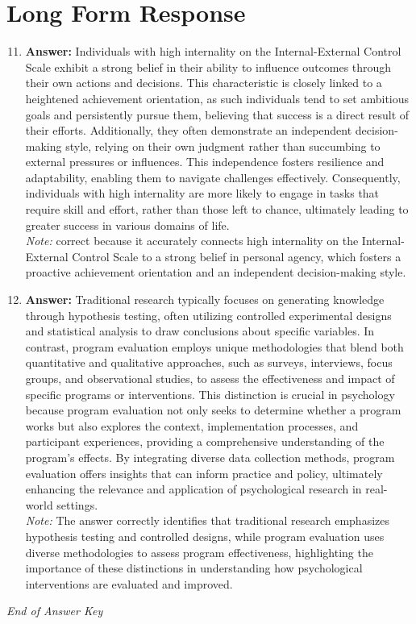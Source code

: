 \documentclass[12pt]{article}
\begin{document}
\section*{Long Form Response}
\begin{enumerate}[label=\arabic*.]
\setcounter{enumi}{10}
\item \textbf{Answer:} Individuals with high internality on the Internal-External Control Scale exhibit a strong belief in their ability to influence outcomes through their own actions and decisions. This characteristic is closely linked to a heightened achievement orientation, as such individuals tend to set ambitious goals and persistently pursue them, believing that success is a direct result of their efforts. Additionally, they often demonstrate an independent decision-making style, relying on their own judgment rather than succumbing to external pressures or influences. This independence fosters resilience and adaptability, enabling them to navigate challenges effectively. Consequently, individuals with high internality are more likely to engage in tasks that require skill and effort, rather than those left to chance, ultimately leading to greater success in various domains of life.
\\ \textit{Note:} correct because it accurately connects high internality on the Internal-External Control Scale to a strong belief in personal agency, which fosters a proactive achievement orientation and an independent decision-making style.
\item \textbf{Answer:} Traditional research typically focuses on generating knowledge through hypothesis testing, often utilizing controlled experimental designs and statistical analysis to draw conclusions about specific variables. In contrast, program evaluation employs unique methodologies that blend both quantitative and qualitative approaches, such as surveys, interviews, focus groups, and observational studies, to assess the effectiveness and impact of specific programs or interventions. This distinction is crucial in psychology because program evaluation not only seeks to determine whether a program works but also explores the context, implementation processes, and participant experiences, providing a comprehensive understanding of the program's effects. By integrating diverse data collection methods, program evaluation offers insights that can inform practice and policy, ultimately enhancing the relevance and application of psychological research in real-world settings.
\\ \textit{Note:} The answer correctly identifies that traditional research emphasizes hypothesis testing and controlled designs, while program evaluation uses diverse methodologies to assess program effectiveness, highlighting the importance of these distinctions in understanding how psychological interventions are evaluated and improved.
\end{enumerate}

\vfill
\noindent\textit{End of Answer Key}
\end{document}
